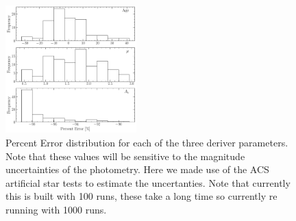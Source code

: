 \begin{figure}
  \centering
  \includegraphics[width=0.45\textwidth]{src/figures/DistributionOfErrors.pdf}
  \caption{Percent Error distribution for each of the three deriver parameters. Note that these values will be sensitive to the magnitude uncertainties of the photometry. Here we made use of the ACS artificial star tests to estimate the uncertanties. {\color{blue}Note that currently this is built with 100 runs, these take a long time so currently re running with 1000 runs.}}
  \label{fig:validationDist}
\end{figure}
